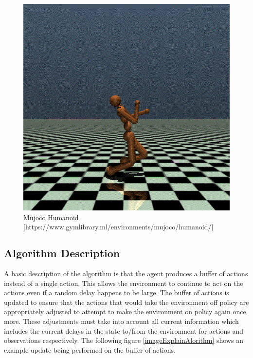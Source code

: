 \documentclass{article} %
\begin{document}
\begin{figure}[H]
\begin{center}
\includegraphics[scale=0.2]{images/mujoco_humanoid_static}
\end{center}
\caption{Mujoco Humanoid [https://www.gymlibrary.ml/environments/mujoco/humanoid/]}
\label{mujoco_Humanoid}
\end{figure}

\subsection{Algorithm Description}

A basic description of the algorithm is that the agent produces a buffer of actions instead of a 
single action. 
This allows the environment to continue to act on the actions even if a random delay happens to be large.
The buffer of actions is updated to ensure that the actions that would take the environment off policy
are appropriately adjusted to attempt to make the environment on policy again once more.
These adjustments must take into account all current information which includes the current delays in 
the state to/from the environment for actions and observations respectively.
The following figure \ref{imageExplainAlorithm} shows an example update being 
performed on the buffer of actions.
\end{document}
